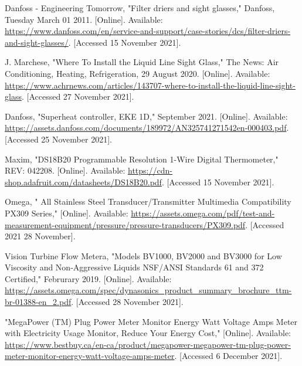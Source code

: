 \documentclass{ucalgarythesis}
\begin{document}
\begin{thebibliography}{9}
     Danfoss - Engineering Tomorrow, "Filter driers and sight glasses," Danfoss, Tuesday March 01 2011. [Online]. Available: \url{https://www.danfoss.com/en/service-and-support/case-stories/dcs/filter-driers-and-sight-glasses/}. [Accessed 15 November 2021].
    
     J. Marchese, "Where To Install the Liquid Line Sight Glass," The News: Air Conditioning, Heating, Refrigeration, 29 August 2020. [Online]. Available: \url{https://www.achrnews.com/articles/143707-where-to-install-the-liquid-line-sight-glass}. [Accessed 27 November 2021].
    
     Danfoss, "Superheat controller, EKE 1D," September 2021. [Online]. Available: \url{https://assets.danfoss.com/documents/189972/AN325741271542en-000403.pdf}. [Accessed 25 November 2021].
    
     Maxim, "DS18B20 Programmable Resolution 1-Wire Digital Thermometer," REV: 042208. [Online]. Available: \url{https://cdn-shop.adafruit.com/datasheets/DS18B20.pdf}. [Accessed 15 November 2021].
    
     Omega, " All Stainless Steel Transducer/Transmitter Multimedia Compatibility PX309 Series," [Online]. Available: \url{https://assets.omega.com/pdf/test-and-measurement-equipment/pressure/pressure-transducers/PX309.pdf}. [Accessed 2021 28 November].
    
     Vision Turbine Flow Metera, "Models BV1000, BV2000 and BV3000 for Low Viscosity and Non-Aggressive Liquids NSF/ANSI Standards 61 and 372 Certified," Februrary 2019. [Online]. Available: \url{https://assets.omega.com/spec/dynasonics_product_summary_brochure_ttm-br-01388-en_2.pdf}. [Accessed 28 November 2021].
    
    \bibitem{[pwer_meter} "MegaPower (TM) Plug Power Meter Monitor Energy Watt Voltage Amps Meter with Electricity Usage Monitor, Reduce Your Energy Cost," [Online]. Available: \url{https://www.bestbuy.ca/en-ca/product/megapower-megapower-tm-plug-power-meter-monitor-energy-watt-voltage-amps-meter}. [Accessed 6 December 2021].

\end{thebibliography}


\appendix




\end{document}
